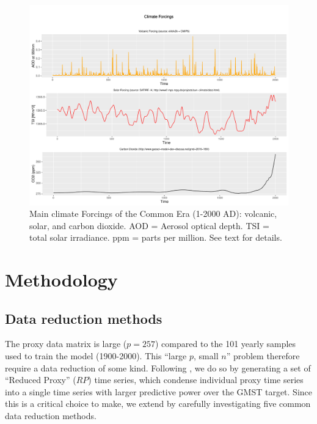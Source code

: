 \documentclass[12pt]{amsart}
\theoremstyle{plain}
\theoremstyle{definition}
\theoremstyle{remark}
\begin{document}
\begin{figure}
  \centering
  \includegraphics[scale=0.40]{forcings}
  \caption{Main climate Forcings of the Common Era (1-2000 AD): volcanic, solar, and carbon dioxide. AOD = Aerosol optical depth. TSI = total solar irradiance. ppm = parts per million. See text for details.}
  \label{fig:forcings}
\end{figure}

\section{Methodology}\label{sec:model}
\subsection{Data reduction methods}
\label{sec:rp}

The proxy data matrix is large ($p=257$) compared to the 101 yearly samples used to train the model (1900-2000). This ``large $p$, small $n$'' problem therefore require  a data reduction of some kind. 
Following \cite{Barboza2014}, we do so by generating a set of ``Reduced Proxy'' ($RP$) time series, which condense individual proxy time series into a single time series with larger predictive power over the GMST target. Since this is a critical choice to make, we extend \cite{Barboza2014} by carefully investigating five common data reduction methods.
\end{document}
